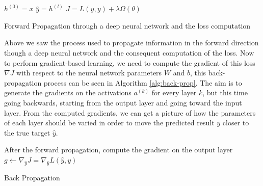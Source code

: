 \documentclass[12pt]{extarticle}
\numberwithin{equation}{section}
\begin{document}
\\\\
	\begin{algorithm}[H]
		\DontPrintSemicolon
		\SetAlgoLined
		\BlankLine
		$h^{(0)} = x$\;
		$\hat{y} = h^{(l)}$\;
		$J = L(\hat{y},y) + \lambda	\Omega(\theta)$
		
		\caption{Forward Propagation through a deep neural network and the loss computation}\label{alg:forward-prop}
	\end{algorithm}

	Above we saw the process used to propagate information in the forward direction though a deep neural network and the consequent computation of the loss. Now to perform gradient-based learning, we need to compute the gradient of this loss $\nabla J$ with respect to the neural network parameters $W$ and $b$, this back-propagation process can be seen in Algorithm \ref{alg:back-prop}. The aim is to generate the gradients on the activations $a^{(k)}$ for every layer $k$, but this time going backwards, starting from the output layer and going toward the input layer. From the computed gradients, we can get a picture of how the parameters of each layer should be varied in order to move the predicted result $y$ closer to the true target $\hat{y}$.
	\begin{algorithm}[t]
		\DontPrintSemicolon
		\SetAlgoLined
		After the forward propagation, compute the gradient on the output layer\;
		$g \leftarrow \nabla_{\hat{y}}J = \nabla_{\hat{y}}L(\hat{y}, y)$\;
		\caption{Back Propagation}\label{alg:back-prop}
	\end{algorithm}
\end{document}
